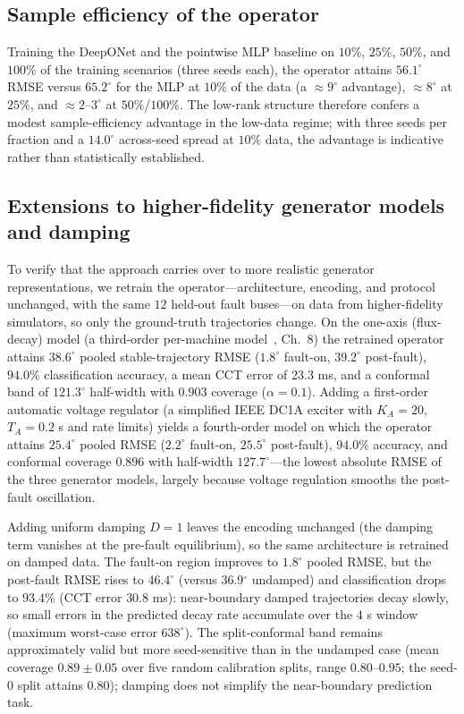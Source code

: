 \documentclass[5p,times]{elsarticle}
\newcommand{\rmsePost}{36.9}          %
\begin{document}
\subsection{Sample efficiency of the operator}
\label{sec:sampleeff}
Training the DeepONet
and the pointwise MLP baseline on $10\%$, $25\%$, $50\%$, and $100\%$ of the training scenarios
(three seeds each), the operator attains $56.1^\circ$ RMSE versus $65.2^\circ$ for the MLP at
$10\%$ of the data (a $\approx9^\circ$ advantage), $\approx8^\circ$ at $25\%$, and
$\approx2$--$3^\circ$ at $50\%$/$100\%$. The low-rank structure therefore confers a modest
sample-efficiency advantage in the low-data regime; with three seeds per fraction and a
$14.0^\circ$ across-seed spread at $10\%$ data, the advantage is indicative rather than
statistically established. 

\subsection{Extensions to higher-fidelity generator models and damping}
To verify that the approach carries over to more realistic generator representations, we retrain
the operator---architecture, encoding, and protocol unchanged, with the same $12$ held-out fault
buses---on data from higher-fidelity simulators, so only the ground-truth trajectories change.
On the one-axis (flux-decay) model (a third-order per-machine model~\cite{sauer1998dynamics},
Ch.~8) the retrained operator attains $38.6^\circ$ pooled stable-trajectory RMSE ($1.8^\circ$
fault-on, $39.2^\circ$ post-fault), $94.0\%$ classification accuracy, a mean CCT error of
$23.3$ ms, and a conformal band of $121.3^\circ$ half-width with $0.903$ coverage
($\alpha{=}0.1$). Adding a first-order automatic voltage regulator (a simplified IEEE DC1A
exciter with $K_A{=}20$, $T_A{=}0.2$ s and rate limits) yields a fourth-order model on which the
operator attains $25.4^\circ$ pooled RMSE ($2.2^\circ$ fault-on, $25.5^\circ$ post-fault),
$94.0\%$ accuracy, and conformal coverage $0.896$ with half-width $127.7^\circ$---the lowest
absolute RMSE of the three generator models, largely because voltage regulation smooths the
post-fault oscillation.

Adding uniform damping $D{=}1$ leaves the encoding unchanged (the damping term vanishes at
the pre-fault equilibrium), so the same architecture is retrained on damped data. The fault-on region improves to $1.8^\circ$ pooled RMSE, but the post-fault RMSE
rises to $46.4^\circ$ (versus \rmsePost{}$^\circ$ undamped) and classification drops to $93.4\%$
(CCT error $30.8$ ms): near-boundary damped trajectories decay slowly, so small errors in the
predicted decay rate accumulate over the $4$ s window (maximum worst-case error $638^\circ$). The
split-conformal band remains approximately valid but more seed-sensitive than in the undamped
case (mean coverage $0.89\pm0.05$ over five random calibration splits, range $0.80$--$0.95$;
the seed-0 split attains $0.80$); damping does not simplify the near-boundary prediction task.
\end{document}
